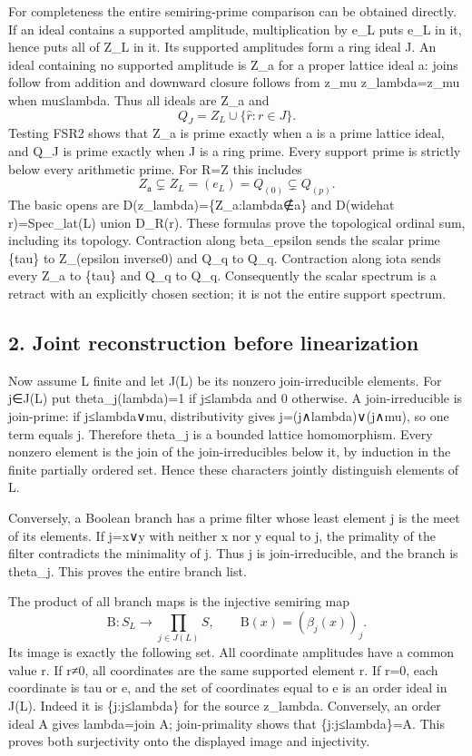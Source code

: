 \documentclass[
  10pt,
  a4paper,
]{article}
\newcommand{\Beta}{\mathrm{B}}
\begin{document}
For completeness the entire semiring-prime comparison can be obtained
directly. If an ideal contains a supported amplitude, multiplication by
e\_L puts e\_L in it, hence puts all of Z\_L in it. Its supported
amplitudes form a ring ideal J. An ideal containing no supported
amplitude is Z\_a for a proper lattice ideal a: joins follow from
addition and downward closure follows from z\_mu z\_lambda=z\_mu when
mu≤lambda. Thus all ideals are Z\_a and \[
Q_J=Z_L\cup\{\widehat r:r\in J\}.
\tag{FSR6}
\] Testing FSR2 shows that Z\_a is prime exactly when a is a prime
lattice ideal, and Q\_J is prime exactly when J is a ring prime. Every
support prime is strictly below every arithmetic prime. For R=Z this
includes \[
Z_{\mathfrak a}\subsetneq Z_L=(e_L)=Q_{(0)}\subsetneq Q_{(p)}.
\tag{FSR7}
\] The basic opens are D(z\_lambda)=\{Z\_a:lambda∉a\} and D(widehat
r)=Spec\_lat(L) union D\_R(r). These formulas prove the topological
ordinal sum, including its topology. Contraction along beta\_epsilon
sends the scalar prime \{tau\} to Z\_(epsilon inverse0) and Q\_q to
Q\_q. Contraction along iota sends every Z\_a to \{tau\} and Q\_q to
Q\_q. Consequently the scalar spectrum is a retract with an explicitly
chosen section; it is not the entire support spectrum.

\subsection{2. Joint reconstruction before
linearization}\label{joint-reconstruction-before-linearization}

Now assume L finite and let J(L) be its nonzero join-irreducible
elements. For j∈J(L) put theta\_j(lambda)=1 if j≤lambda and 0 otherwise.
A join-irreducible is join-prime: if j≤lambda∨mu, distributivity gives
j=(j∧lambda)∨(j∧mu), so one term equals j. Therefore theta\_j is a
bounded lattice homomorphism. Every nonzero element is the join of the
join-irreducibles below it, by induction in the finite partially ordered
set. Hence these characters jointly distinguish elements of L.

Conversely, a Boolean branch has a prime filter whose least element j is
the meet of its elements. If j=x∨y with neither x nor y equal to j, the
primality of the filter contradicts the minimality of j. Thus j is
join-irreducible, and the branch is theta\_j. This proves the entire
branch list.

The product of all branch maps is the injective semiring map \[
\Beta:S_L\longrightarrow\prod_{j\in J(L)}S,\qquad
\Beta(x)=(\beta_j(x))_j.
\tag{FSR8}
\] Its image is exactly the following set. All coordinate amplitudes
have a common value r. If r≠0, all coordinates are the same supported
element r. If r=0, each coordinate is tau or e, and the set of
coordinates equal to e is an order ideal in J(L). Indeed it is
\{j:j≤lambda\} for the source z\_lambda. Conversely, an order ideal A
gives lambda=join A; join-primality shows that \{j:j≤lambda\}=A. This
proves both surjectivity onto the displayed image and injectivity.
\end{document}
